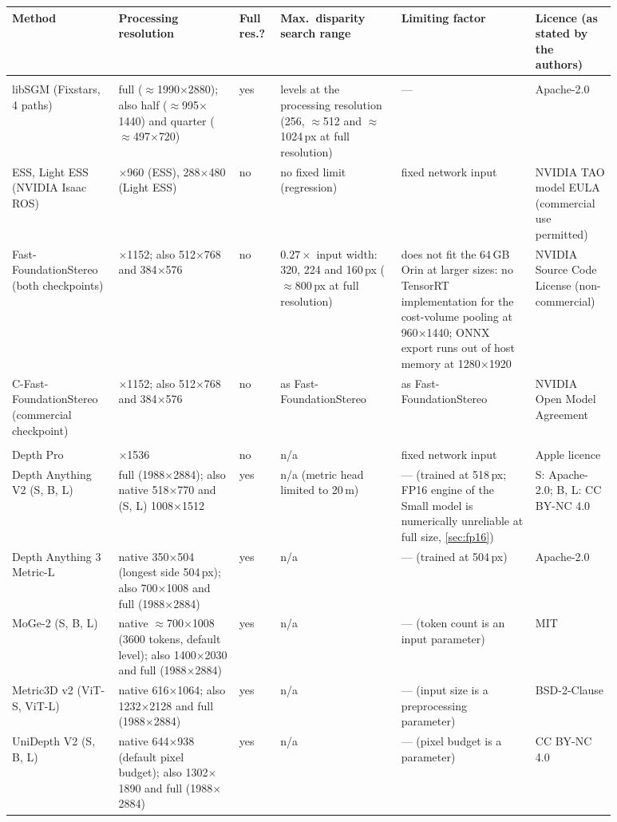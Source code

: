 \begin{tabular}{@{}>{\raggedright\arraybackslash}p{0.14\linewidth}>{\raggedright\arraybackslash}p{0.18\linewidth}>{\raggedright\arraybackslash}p{0.06\linewidth}>{\raggedright\arraybackslash}p{0.18\linewidth}>{\raggedright\arraybackslash}p{0.20\linewidth}>{\raggedright\arraybackslash}p{0.12\linewidth}@{}}
\toprule
Method & Processing resolution & Full res.? & Max.\ disparity search range & Limiting factor & Licence (as stated by the authors) \\
\midrule
\multicolumn{6}{@{}l}{\emph{Stereo}} \\
libSGM (Fixstars, 4 paths) & full ($\approx$1990$\times$2880); also half ($\approx$995$\times$1440) and quarter ($\approx$497$\times$720) & yes & 256 levels at the processing resolution (256, $\approx$512 and $\approx$1024\,px at full resolution) & --- & Apache-2.0 \\
ESS, Light ESS (NVIDIA Isaac ROS) & 576$\times$960 (ESS), 288$\times$480 (Light ESS) & no & no fixed limit (regression) & fixed network input & NVIDIA TAO model EULA (commercial use permitted) \\
Fast-Foundation\-Stereo (both checkpoints) & 768$\times$1152; also 512$\times$768 and 384$\times$576 & no & $0.27\times$ input width: 320, 224 and 160\,px ($\approx$800\,px at full resolution) & does not fit the 64\,GB Orin at larger sizes: no TensorRT implementation for the cost-volume pooling at 960$\times$1440; ONNX export runs out of host memory at 1280$\times$1920 & NVIDIA Source Code License (non-commercial) \\
C-Fast-Foundation\-Stereo (commercial checkpoint) & 768$\times$1152; also 512$\times$768 and 384$\times$576 & no & as Fast-FoundationStereo & as Fast-FoundationStereo & NVIDIA Open Model Agreement \\
\midrule
\multicolumn{6}{@{}l}{\emph{Monocular}} \\
Depth Pro & 1536$\times$1536 & no & n/a & fixed network input & Apple licence \\
Depth Anything V2 (S, B, L) & full (1988$\times$2884); also native 518$\times$770 and (S, L) 1008$\times$1512 & yes & n/a (metric head limited to 20\,m) & --- (trained at 518\,px; FP16 engine of the Small model is numerically unreliable at full size, \cref{sec:fp16}) & S: Apache-2.0; B, L: CC BY-NC 4.0 \\
Depth Anything 3 Metric-L & native 350$\times$504 (longest side 504\,px); also 700$\times$1008 and full (1988$\times$2884) & yes & n/a & --- (trained at 504\,px) & Apache-2.0 \\
MoGe-2 (S, B, L) & native $\approx$700$\times$1008 (3600 tokens, default level); also 1400$\times$2030 and full (1988$\times$2884) & yes & n/a & --- (token count is an input parameter) & MIT \\
Metric3D v2 (ViT-S, ViT-L) & native 616$\times$1064; also 1232$\times$2128 and full (1988$\times$2884) & yes & n/a & --- (input size is a preprocessing parameter) & BSD-2-Clause \\
UniDepth V2 (S, B, L) & native 644$\times$938 (default pixel budget); also 1302$\times$1890 and full (1988$\times$2884) & yes & n/a & --- (pixel budget is a parameter) & CC BY-NC 4.0 \\
\bottomrule
\end{tabular}

